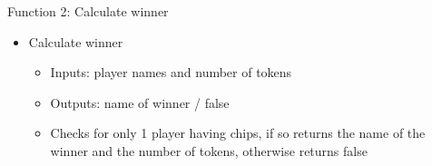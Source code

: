 \documentclass{article}
\begin{document}
Function 2: 
Calculate winner
\begin{itemize}
	\item Calculate winner
	\begin{itemize}
		\item Inputs: player names and number of tokens
		\item Outputs: name of winner / false
		\item Checks for only 1 player having chips, if so returns the name of the winner and the number of tokens, otherwise returns false
	\end{itemize}
\end{itemize}
\end{document}

